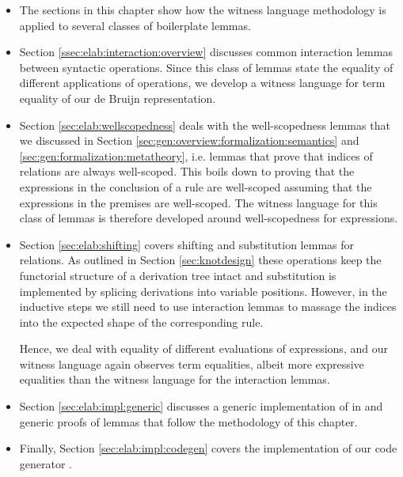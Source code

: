 \begin{itemize}
\item The sections in this chapter show how the witness language methodology
  is applied to several classes of boilerplate lemmas.

\item Section \ref{ssec:elab:interaction:overview} discusses common interaction
  lemmas between syntactic operations. Since this class of lemmas state the
  equality of different applications of operations, we develop a witness
  language for term equality of our de Bruijn representation.

\item Section \ref{sec:elab:wellscopedness} deals with the well-scopedness
  lemmas that we discussed in Section
  \ref{sec:gen:overview:formalization:semantics} and
  \ref{sec:gen:formalization:metatheory}, i.e. lemmas that prove that indices of
  relations are always well-scoped. This boils down to proving that the
  expressions in the conclusion of a rule are well-scoped assuming that the
  expressions in the premises are well-scoped. The witness language for this
  class of lemmas is therefore developed around well-scopedness for expressions.

\item Section \ref{sec:elab:shifting} covers shifting and substitution lemmas
  for relations. As outlined in Section \ref{sec:knotdesign} these operations
  keep the functorial structure of a derivation tree intact and substitution is
  implemented by splicing derivations into variable positions. However, in the
  inductive steps we still need to use interaction lemmas to massage the indices
  into the expected shape of the corresponding rule.

  Hence, we deal with equality of different evaluations of expressions, and our
  witness language again observes term equalities, albeit more expressive
  equalities than the witness language for the interaction lemmas.

\item Section \ref{sec:elab:impl:generic} discusses a generic implementation of
  \Knot in \Coq and generic proofs of lemmas that follow the methodology of this
  chapter.

\item Finally, Section \ref{sec:elab:impl:codegen} covers the implementation of
  our code generator \Needle.
\end{itemize}




